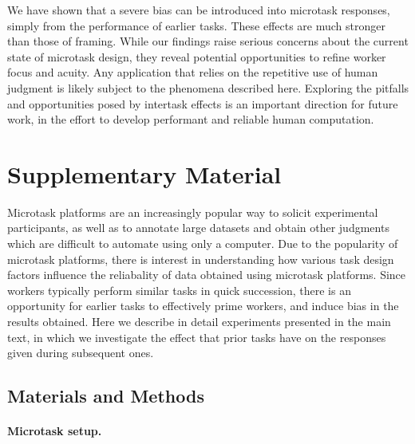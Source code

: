 \documentclass[12pt]{article}
\begin{document}
We have shown that a severe bias can be introduced into microtask 
responses, simply from the performance of earlier tasks. 
These effects are much stronger than those of framing.  
While our findings raise serious concerns about the 
current state of microtask design, they reveal potential opportunities 
to refine worker focus and acuity.  Any application that relies
on the repetitive use of human judgment is likely subject to the phenomena
described here.  Exploring the pitfalls and opportunities posed by
intertask effects is an important direction for future work, 
in the effort to develop performant and reliable human computation.




\pagebreak
\section*{Supplementary Material}
\renewcommand{\figurename}{Figure S\!\!}
\renewcommand{\tablename}{Table S\!\!}
\renewcommand{\theequation}{S\arabic{equation}}
\setcounter{figure}{0}
\setcounter{table}{0}
\setcounter{equation}{0}

Microtask platforms are an increasingly popular way to solicit experimental
participants, as well as to annotate large datasets and obtain other 
judgments which are difficult to automate using only a computer.  
Due to the popularity of microtask platforms, there is interest in 
understanding how various task design factors
influence the reliabality of data obtained using microtask platforms.  
Since workers typically perform similar tasks in quick succession, there is
an opportunity for earlier tasks to effectively prime workers, and induce 
bias in the results obtained.
Here we describe in detail experiments presented in the main text, in which
we investigate the effect that prior tasks have on the responses given during
subsequent ones.  

\subsection*{Materials and Methods}

\paragraph{Microtask setup.}
\end{document}
